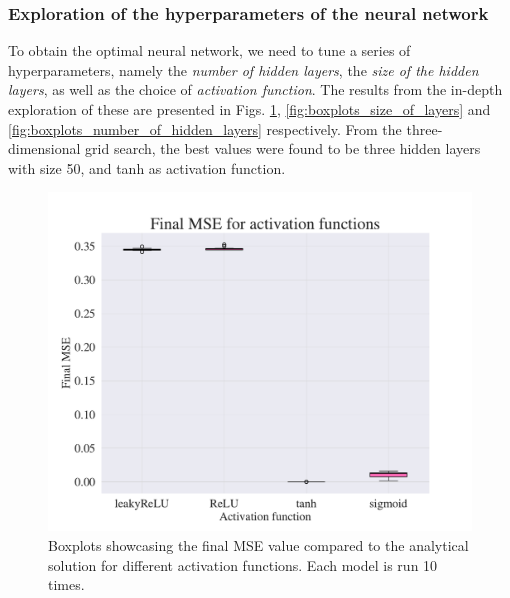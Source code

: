 \subsubsection{Exploration of the hyperparameters of the neural network}

To obtain the optimal neural network, we need to tune a series of hyperparameters, namely the \textit{number of hidden layers}, the \textit{size of the hidden layers}, as well as the choice of \textit{activation function}. The results from the in-depth exploration of these are presented in Figs. \ref{fig:boxplots_activations}, \ref{fig:boxplots_size_of_layers} and \ref{fig:boxplots_number_of_hidden_layers} respectively. 
From the three-dimensional grid search, the best values were found to be three hidden layers with size 50, and tanh as activation function.


\begin{figure}[h!]
    \centering
    \includegraphics[width=1.0\linewidth]{project_3/plots/activation_search.pdf}
    \caption{Boxplots showcasing the final MSE value compared to the analytical solution for different activation functions. Each model is run 10 times.}
    \label{fig:boxplots_activations}
\end{figure}


